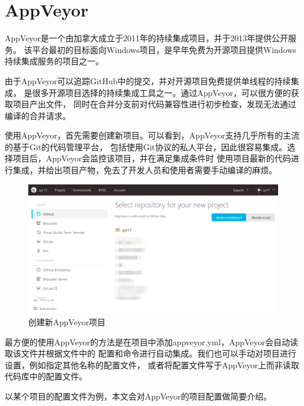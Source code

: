 \chapter{AppVeyor}

AppVeyor是一个由加拿大成立于2011年的持续集成项目，并于2013年提供公开服务。
该平台最初的目标面向Windows项目，是早年免费为开源项目提供Windows持续集成服务的项目之一。

由于AppVeyor可以追踪GitHub中的提交，并对开源项目免费提供单线程的持续集成，
是很多开源项目选择的持续集成工具之一。通过AppVeyor，可以很方便的获取项目产出文件，
同时在合并分支前对代码兼容性进行初步检查，发现无法通过编译的合并请求。

使用AppVeyor，首先需要创建新项目。可以看到，AppVeyor支持几乎所有的主流的基于Git的代码管理平台，
包括使用Git协议的私人平台，因此很容易集成。选择项目后，AppVeyor会监控该项目，并在满足集成条件时
使用项目最新的代码进行集成，并给出项目产物，免去了开发人员和使用者需要手动编译的麻烦。

\begin{figure}[h]
    \centering
    \includegraphics[width=1\textwidth]{figures/appveyor/create.png}
    \caption{创建新AppVeyor项目}
    \label{fig:appveyor_create}
\end{figure}

最方便的使用AppVeyor的方法是在项目中添加appveyor.yml，AppVeyor会自动读取该文件并根据文件中的
配置和命令进行自动集成。我们也可以手动对项目进行设置，例如指定其他名称的配置文件，
或者将配置文件写于AppVeyor上而非读取代码库中的配置文件。

以某个项目的配置文件为例，本文会对AppVeyor的项目配置做简要介绍。

